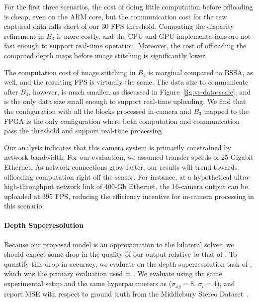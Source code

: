 For the first three scenarios, the cost of doing little computation before offloading is cheap, even on the ARM core, but the communication cost for the raw captured data falls short of our 30 FPS threshold. Computing the disparity refinement in $B_3$ is more costly, and the CPU and GPU implementations are not fast enough to support real-time operation. Moreover, the cost of offloading the computed depth maps before image stitching is significantly lower.

The computation cost of image stitching in $B_4$ is marginal compared to BSSA, as well, and the resulting FPS is virtually the same. The data size to communicate after $B_4$, however, is much smaller, as discussed in Figure~\ref{fig:vr-data-scale}, and is the only data size small enough to support real-time uploading. We find that the configuration with all the blocks processed in-camera and $B_3$ mapped to the FPGA is the only configuration where both computation and communication pass the threshold and support real-time processing.

Our analysis indicates that this camera system is primarily constrained by network bandwidth. For our evaluation, we assumed transfer speeds of 25 Gigabit Ethernet. As network connections grow faster, our results will trend towards offloading computation right off the sensor. For instance, at a hypothetical ultra-high-throughput network link of 400-Gb Ethernet, the 16-camera output can be uploaded at 395 FPS, reducing the efficiency incentive for in-camera processing in this scenario.

\paragraph{Depth Superresolution}
\label{sec:depth_superres}

Because our proposed model is an approximation to the bilateral solver, we
should expect some drop in the quality of our output relative to that
of \cite{BarronPoole2016}. To quantify this drop in accuracy, we evaluate on the
depth superresolution task of \cite{ferstl2013b}, which was the primary
evaluation used in \cite{BarronPoole2016}. We evaluate using the same experimental
setup and the same hyperparameters as \cite{BarronPoole2016} ($\sigma_{xy} = 8$, $\sigma_{l} = 4$), and report MSE with respect to ground truth from the Middlebury Stereo Dataset~\cite{middlebury-data}.

